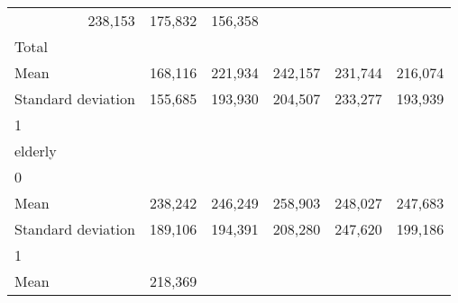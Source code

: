 \begin{tabular}{llllll}
  \multicolumn{1}{r}{238,153} &
  \multicolumn{1}{r}{175,832} &
  \multicolumn{1}{r}{156,358} \\
\multicolumn{1}{l}{\hspace{3em}Total} &
  \multicolumn{1}{|r}{} &
  \multicolumn{1}{r}{} &
  \multicolumn{1}{r}{} &
  \multicolumn{1}{r}{} &
  \multicolumn{1}{r}{} \\
\multicolumn{1}{l}{\hspace{4em}Mean} &
  \multicolumn{1}{|r}{168,116} &
  \multicolumn{1}{r}{221,934} &
  \multicolumn{1}{r}{242,157} &
  \multicolumn{1}{r}{231,744} &
  \multicolumn{1}{r}{216,074} \\
\multicolumn{1}{l}{\hspace{4em}Standard deviation} &
  \multicolumn{1}{|r}{155,685} &
  \multicolumn{1}{r}{193,930} &
  \multicolumn{1}{r}{204,507} &
  \multicolumn{1}{r}{233,277} &
  \multicolumn{1}{r}{193,939} \\
\multicolumn{1}{l}{\hspace{1em}1} &
  \multicolumn{1}{|r}{} &
  \multicolumn{1}{r}{} &
  \multicolumn{1}{r}{} &
  \multicolumn{1}{r}{} &
  \multicolumn{1}{r}{} \\
\multicolumn{1}{l}{\hspace{2em}elderly} &
  \multicolumn{1}{|r}{} &
  \multicolumn{1}{r}{} &
  \multicolumn{1}{r}{} &
  \multicolumn{1}{r}{} &
  \multicolumn{1}{r}{} \\
\multicolumn{1}{l}{\hspace{3em}0} &
  \multicolumn{1}{|r}{} &
  \multicolumn{1}{r}{} &
  \multicolumn{1}{r}{} &
  \multicolumn{1}{r}{} &
  \multicolumn{1}{r}{} \\
\multicolumn{1}{l}{\hspace{4em}Mean} &
  \multicolumn{1}{|r}{238,242} &
  \multicolumn{1}{r}{246,249} &
  \multicolumn{1}{r}{258,903} &
  \multicolumn{1}{r}{248,027} &
  \multicolumn{1}{r}{247,683} \\
\multicolumn{1}{l}{\hspace{4em}Standard deviation} &
  \multicolumn{1}{|r}{189,106} &
  \multicolumn{1}{r}{194,391} &
  \multicolumn{1}{r}{208,280} &
  \multicolumn{1}{r}{247,620} &
  \multicolumn{1}{r}{199,186} \\
\multicolumn{1}{l}{\hspace{3em}1} &
  \multicolumn{1}{|r}{} &
  \multicolumn{1}{r}{} &
  \multicolumn{1}{r}{} &
  \multicolumn{1}{r}{} &
  \multicolumn{1}{r}{} \\
\multicolumn{1}{l}{\hspace{4em}Mean} &
  \multicolumn{1}{|r}{218,369} &

\end{tabular}
